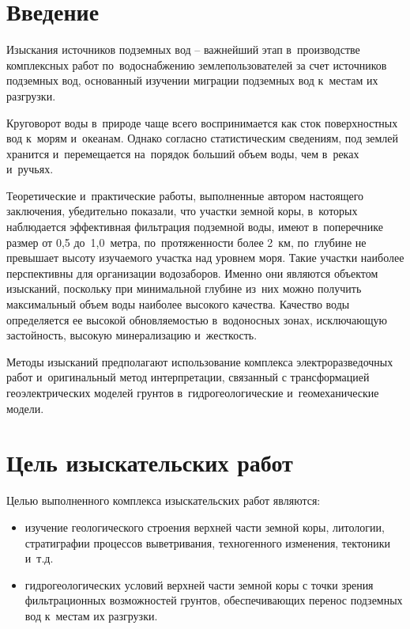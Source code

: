 \newpage

\section{Введение}

Изыскания источников подземных вод -- важнейший этап в~производстве комплексных работ по~водоснабжению землепользователей за счет источников подземных вод, основанный изучении миграции подземных вод к~местам их разгрузки.

Круговорот воды в~природе чаще всего воспринимается как сток поверхностных вод к~морям и~океанам. Однако согласно статистическим сведениям, под землей хранится и~перемещается на~порядок больший объем воды, чем в~реках и~ручьях.

Теоретические и~практические работы, выполненные автором настоящего заключения, убедительно показали, что участки земной коры, в~которых наблюдается эффективная фильтрация подземной воды, имеют в~поперечнике размер от 0,5 до~1,0~метра, по~протяженности более 2~км, по~глубине не превышает высоту изучаемого участка над уровнем моря. Такие участки наиболее перспективны для организации водозаборов. Именно они являются объектом изысканий, поскольку при минимальной глубине из~них можно получить максимальный объем воды наиболее высокого качества. Качество воды определяется ее высокой обновляемостью в~водоносных зонах, исключающую застойность, высокую минерализацию и~жесткость.

Методы изысканий предполагают использование комплекса электроразведочных работ и~оригинальный метод интерпретации, связанный с трансформацией геоэлектрических моделей грунтов в~гидрогеологические и~геомеханические модели.

\section{Цель изыскательских работ}
Целью выполненного комплекса изыскательских работ являются:
\begin{itemize}
	\item изучение геологического строения верхней части земной коры, литологии, стратиграфии процессов выветривания, техногенного изменения, тектоники и~т.д.
	\item гидрогеологических условий верхней части земной коры с точки зрения фильтрационных возможностей грунтов, обеспечивающих перенос подземных вод к~местам их разгрузки.
\end{itemize}


